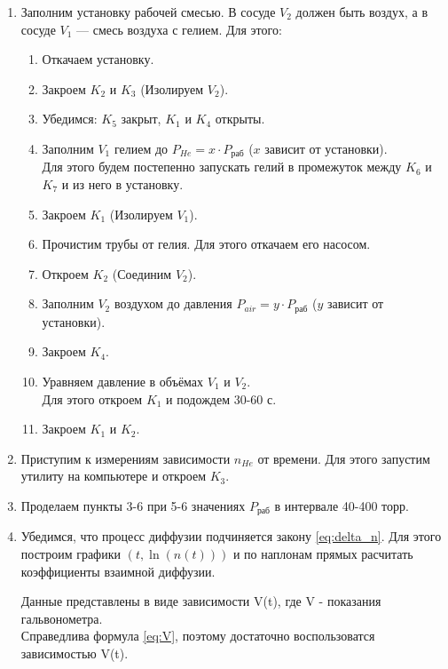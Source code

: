 \documentclass[a4paper,12pt]{article}
\numberwithin{equation}{section}
\begin{document}
\begin{enumerate}
  \item Заполним установку рабочей смесью.
  В сосуде $V_2$ должен быть воздух, а в сосуде $V_1$ — смесь воздуха с гелием.
  Для этого:
  \begin{enumerate}
    \item Откачаем установку.
    \item Закроем $K_2$ и $K_3$ (Изолируем $V_2$).
    \item Убедимся: $K_5$ закрыт, $K_1$ и $K_4$ открыты.
    \item Заполним $V_1$ гелием до $P_{He} = x \cdot P_{\text{раб}}$ 
    ($x$ зависит от установки). \\
    Для этого будем постепенно запускать гелий в промежуток между $K_6$ и $K_7$ и из него в установку.
    \item Закроем $K_1$ (Изолируем $V_1$).
    \item Прочистим трубы от гелия. Для этого откачаем его насосом.
    \item Откроем $K_2$ (Соединим $V_2$).
    \item Заполним $V_2$ воздухом до давления $P_{air} = y \cdot P_{\text{раб}}$
    ($y$ зависит от установки). \\
    \item Закроем $K_4$.
    \item Уравняем давление в объёмах $V_1$ и $V_2$. \\
    Для этого откроем $K_1$ и подождем 30-60 с.
    \item Закроем $K_1$ и $K_2$.
  \end{enumerate}

  \item Приступим к измерениям зависимости $n_{He}$ от времени.
  Для этого запустим утилиту на компьютере и откроем $K_3$.

  \item Проделаем пункты 3-6 при 5-6 значениях $P_{\text{раб}}$ в интервале 40-400 торр.
  
  \item Убедимся, что процесс диффузии подчиняется закону \eqref{eq:delta_n}.
  Для этого построим графики $(t, \ln{(n(t))})$ и по наплонам прямых расчитать коэффициенты взаимной диффузии.

  Данные представлены в виде зависимости V(t), где V - показания гальвонометра. \\
  Справедлива формула \ref{eq:V}, поэтому достаточно воспользоватся зависимостью V(t). \\


\end{enumerate}
\end{document}
